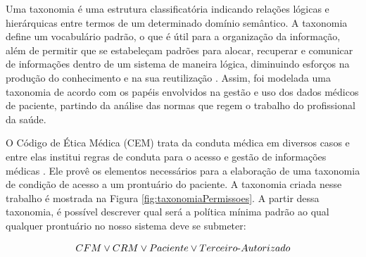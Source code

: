 \documentclass[a4paper,11pt]{article}
\begin{document}
Uma taxonomia é uma estrutura classificatória indicando relações lógicas e hierárquicas entre termos de um determinado domínio semântico.
A taxonomia define um vocabulário padrão, o que é útil para a organização da informação, além de permitir que se estabeleçam padrões para alocar, recuperar e comunicar de informações dentro de um sistema de maneira lógica, diminuindo esforços na produção do conhecimento e na sua reutilização \cite{Campos2007}.
Assim, foi modelada uma taxonomia de acordo com os papéis envolvidos na gestão e uso dos dados médicos de paciente, partindo da análise das normas que regem o trabalho do profissional da saúde. %

O Código de Ética Médica (CEM) trata da conduta médica em diversos casos e entre elas institui regras de conduta para o acesso e gestão de informações médicas \cite{ConselhoFederaldeMedicina2019}.
Ele provê os elementos necessários para a elaboração de uma taxonomia de condição de acesso a um prontuário do paciente.
A taxonomia criada nesse trabalho é mostrada na Figura \ref{fig:taxonomiaPermissoes}. %
A partir dessa taxonomia, é possível descrever qual será a política mínima padrão ao qual qualquer prontuário {\color{blue}no nosso sistema} deve se submeter:

\[ CFM \vee CRM \vee Paciente \vee Terceiro\textnormal{-}Autorizado \]



\end{document}
